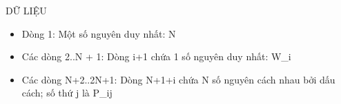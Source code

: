 DỮ LIỆU  
\begin{itemize}
	\item     Dòng 1: Một số nguyên duy nhất: N   
	\item     Các dòng 2..N + 1: Dòng i+1 chứa 1 số nguyên duy nhất: W\_i   
	\item     Các dòng N+2..2N+1: Dòng N+1+i chứa N số nguyên cách nhau bởi dấu cách; số thứ         j là P\_ij   
\end{itemize}